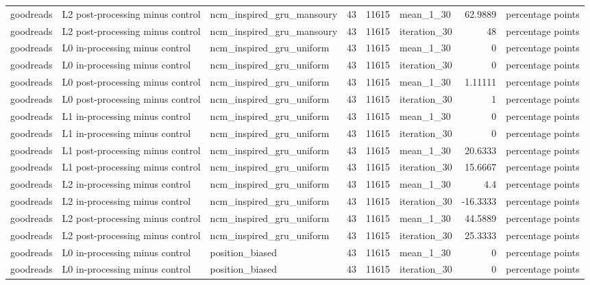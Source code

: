 \begin{table}[htbp!]
\begin{tabular}{lllrrlrl}
goodreads & L2 post-processing minus control & ncm\_inspired\_gru\_mansoury & 43 & 11615 & mean\_1\_30 & 62.9889 & percentage points \\
goodreads & L2 post-processing minus control & ncm\_inspired\_gru\_mansoury & 43 & 11615 & iteration\_30 & 48 & percentage points \\
goodreads & L0 in-processing minus control & ncm\_inspired\_gru\_uniform & 43 & 11615 & mean\_1\_30 & 0 & percentage points \\
goodreads & L0 in-processing minus control & ncm\_inspired\_gru\_uniform & 43 & 11615 & iteration\_30 & 0 & percentage points \\
goodreads & L0 post-processing minus control & ncm\_inspired\_gru\_uniform & 43 & 11615 & mean\_1\_30 & 1.11111 & percentage points \\
goodreads & L0 post-processing minus control & ncm\_inspired\_gru\_uniform & 43 & 11615 & iteration\_30 & 1 & percentage points \\
goodreads & L1 in-processing minus control & ncm\_inspired\_gru\_uniform & 43 & 11615 & mean\_1\_30 & 0 & percentage points \\
goodreads & L1 in-processing minus control & ncm\_inspired\_gru\_uniform & 43 & 11615 & iteration\_30 & 0 & percentage points \\
goodreads & L1 post-processing minus control & ncm\_inspired\_gru\_uniform & 43 & 11615 & mean\_1\_30 & 20.6333 & percentage points \\
goodreads & L1 post-processing minus control & ncm\_inspired\_gru\_uniform & 43 & 11615 & iteration\_30 & 15.6667 & percentage points \\
goodreads & L2 in-processing minus control & ncm\_inspired\_gru\_uniform & 43 & 11615 & mean\_1\_30 & 4.4 & percentage points \\
goodreads & L2 in-processing minus control & ncm\_inspired\_gru\_uniform & 43 & 11615 & iteration\_30 & -16.3333 & percentage points \\
goodreads & L2 post-processing minus control & ncm\_inspired\_gru\_uniform & 43 & 11615 & mean\_1\_30 & 44.5889 & percentage points \\
goodreads & L2 post-processing minus control & ncm\_inspired\_gru\_uniform & 43 & 11615 & iteration\_30 & 25.3333 & percentage points \\
goodreads & L0 in-processing minus control & position\_biased & 43 & 11615 & mean\_1\_30 & 0 & percentage points \\
goodreads & L0 in-processing minus control & position\_biased & 43 & 11615 & iteration\_30 & 0 & percentage points \\

\end{tabular}
\end{table}
